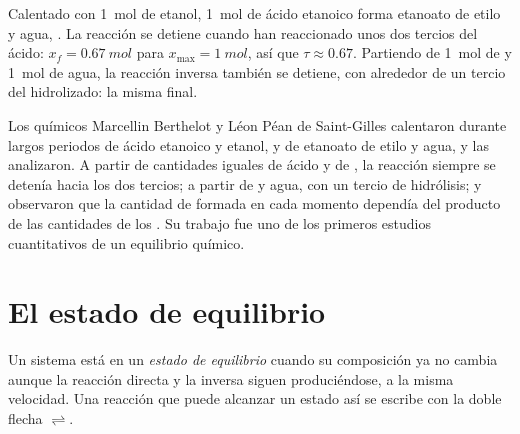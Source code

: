 \begin{example}\label{ex:g12:equilibrium:berthelot}
Calentado con \qty{1}{mol} de etanol, \qty{1}{mol} de ácido etanoico
forma etanoato de etilo y agua,
. La reacción se detiene cuando
han reaccionado unos dos tercios del ácido: $x_f = \qty{0.67}{mol}$ para
$x_{\max} = \qty{1}{mol}$, así que $\tau \approx 0.67$. Partiendo de
\qty{1}{mol} de  y \qty{1}{mol} de agua, la reacción inversa
también se detiene, con alrededor de un tercio del  hidrolizado: la
misma  final.
\end{example}

\begin{history}
Los químicos Marcellin Berthelot y Léon Péan de Saint-Gilles calentaron
durante largos periodos  de ácido etanoico y etanol, y de
etanoato de etilo y agua, y las analizaron. A partir de cantidades
iguales de ácido y de , la reacción siempre se detenía hacia los
dos tercios; a partir de  y agua, con un tercio de hidrólisis; y
observaron que la cantidad de  formada en cada momento dependía del
producto de las cantidades de los . Su trabajo fue uno de los
primeros estudios cuantitativos de un equilibrio químico.
\end{history}

\section{El estado de equilibrio}

\begin{definition}\label{def:g12:equilibrium:equilibrium-state}
Un sistema está en un \emph{estado de equilibrio}
cuando su composición ya no cambia aunque la reacción directa y la
inversa siguen produciéndose, a la misma velocidad. Una reacción que
puede alcanzar un estado así se escribe con la doble flecha $\rightleftharpoons$.
\end{definition}

